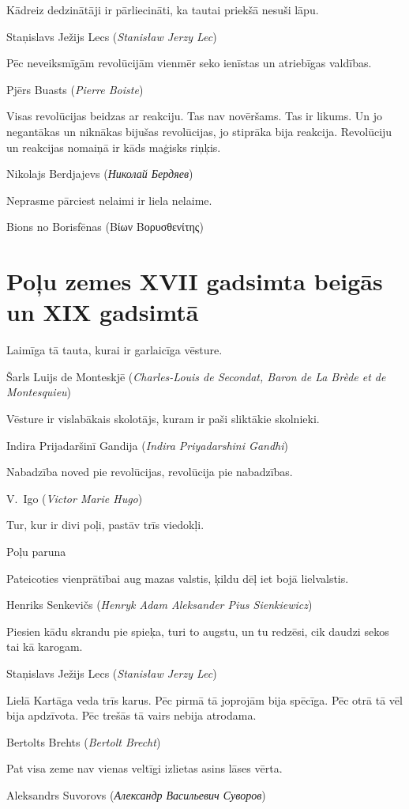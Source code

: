 \documentclass[twoside,a5paper,12pt,fleqn,openany]{extbook}
\newcommand{\pltxti}[1]{\textit{\textpolish{#1}}}
\newcommand{\rutxti}[1]{\textit{\textrussian{#1}}}
\newcommand{\detxti}[1]{\textit{\textgerman{#1}}}
\newcommand{\frtxti}[1]{\textit{\textfrench{#1}}}
\newcommand{\entxti}[1]{\textit{\textenglish{#1}}}
\newcommand{\eltxti}[1]{\textgreek{#1}}
\begin{document}
\epigraph
{Kādreiz dedzinātāji ir pārliecināti, ka tautai priekšā nesuši lāpu.}
{Staņislavs Ježijs Lecs (\pltxti{Stanisław Jerzy Lec})}

\epigraph
{Pēc neveiksmīgām revolūcijām vienmēr seko ienīstas un atriebīgas valdības.}
{Pjērs Buasts (\frtxti{Pierre Boiste})}

\epigraph
{Visas revolūcijas beidzas ar reakciju. Tas nav novēršams. Tas ir likums. Un jo negantākas un niknākas bijušas revolūcijas, jo stiprāka bija reakcija. Revolūciju un reakcijas nomaiņā ir kāds maģisks riņķis.}
{Nikolajs Berdjajevs (\rutxti{Николай Бердяев})}

\newpage

\epigraph
{Neprasme pārciest nelaimi ir liela nelaime.}
{Bions no Borisfēnas (\eltxti{Βίων Βορυσθενίτης})}

\section{Poļu zemes XVII gadsimta beigās un XIX gadsimtā}

\epigraph
{Laimīga tā tauta, kurai ir garlaicīga vēsture.}
{Šarls Luijs de Monteskjē (\frtxti{Charles-Louis de Secondat, Baron de La Brède et de Montesquieu})}

\epigraph
{Vēsture ir vislabākais skolotājs, kuram ir paši sliktākie skolnieki.}
{Indira Prijadaršinī Gandija (\entxti{Indira Priyadarshini Gandhi})}

\epigraph
{Nabadzība noved pie revolūcijas, revolūcija pie nabadzības.}
{V.~Igo (\frtxti{Victor Marie Hugo})}

\epigraph
{Tur, kur ir divi poļi, pastāv trīs viedokļi.}
{Poļu paruna}

\epigraph
{Pateicoties vienprātībai aug mazas valstis, ķildu dēļ iet bojā lielvalstis.}
{Henriks Senkevičs (\pltxti{Henryk Adam Aleksander Pius Sienkiewicz})}

\newpage

\epigraph
{Piesien kādu skrandu pie spieķa, turi to augstu, un tu redzēsi, cik daudzi sekos tai kā karogam.}
{Staņislavs Ježijs Lecs (\pltxti{Stanisław Jerzy Lec})}

\epigraph
{Lielā Kartāga veda trīs karus. Pēc pirmā tā joprojām bija spēcīga. Pēc otrā tā vēl bija apdzīvota. Pēc trešās tā vairs nebija atrodama.}
{Bertolts Brehts (\detxti{Bertolt Brecht})}

\epigraph
{Pat visa zeme nav vienas veltīgi izlietas asins lāses vērta.}
{Aleksandrs Suvorovs (\rutxti{Александр Васильевич Суворов})}
\end{document}
